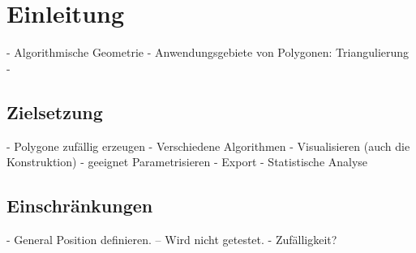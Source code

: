 \section{Einleitung}


- Algorithmische Geometrie
- Anwendungsgebiete von Polygonen: Triangulierung 
- 

\subsection{Zielsetzung}

- Polygone zufällig erzeugen
- Verschiedene Algorithmen
- Visualisieren (auch die Konstruktion)
- geeignet Parametrisieren
- Export
- Statistische Analyse

\subsection{Einschränkungen}

- General Position definieren.
-- Wird nicht getestet.
- Zufälligkeit?

